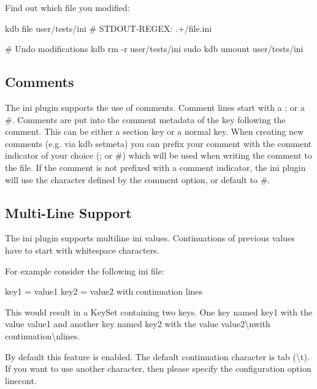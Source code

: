 Find out which file you modified\+:


\begin{DoxyCode}
kdb file user/tests/ini
# STDOUT-REGEX: .+/file.ini

# Undo modifications
kdb rm -r user/tests/ini
sudo kdb umount user/tests/ini
\end{DoxyCode}


\subsection*{Comments}

The ini plugin supports the use of comments. Comment lines start with a \textquotesingle{};\textquotesingle{} or a \textquotesingle{}\#\textquotesingle{}. Comments are put into the comment metadata of the key following the comment. This can be either a section key or a normal key. When creating new comments (e.\+g. via {\ttfamily kdb setmeta}) you can prefix your comment with the comment indicator of your choice (\textquotesingle{};\textquotesingle{} or \textquotesingle{}\#\textquotesingle{}) which will be used when writing the comment to the file. If the comment is not prefixed with a comment indicator, the ini plugin will use the character defined by the {\ttfamily comment} option, or default to \textquotesingle{}\#\textquotesingle{}.

\subsection*{Multi-\/\+Line Support}

The ini plugin supports multiline ini values. Continuations of previous values have to start with whitespace characters.

For example consider the following ini file\+:


\begin{DoxyCode}
key1 = value1
key2 = value2
        with continuation
        lines
\end{DoxyCode}


This would result in a Key\+Set containing two keys. One key named {\ttfamily key1} with the value {\ttfamily value1} and another key named {\ttfamily key2} with the value {\ttfamily value2\textbackslash{}nwith continuation\textbackslash{}nlines}.

By default this feature is enabled. The default continuation character is tab ({\ttfamily \textbackslash{}t}). If you want to use another character, then please specify the configuration option {\ttfamily linecont}.

